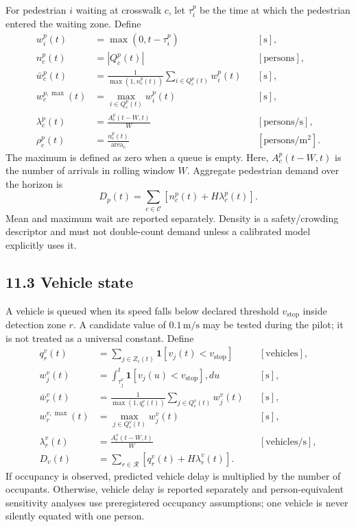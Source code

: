 \documentclass[
  english,
  11pt,
  a4paper,
]{article}
\begin{document}
For pedestrian \(i\) waiting at crosswalk \(c\), let \(\tau_i^p\) be
the time at which the pedestrian entered the waiting zone. Define
\begin{align}
  w_i^p(t) &= \max\!\left(0,t-\tau_i^p\right) &&[\mathrm{s}],\\
  n_c^p(t) &= \left|Q_c^p(t)\right| &&[\mathrm{persons}],\\
  \bar w_c^p(t) &= \frac{1}{\max(1,n_c^p(t))}
    \sum_{i\in Q_c^p(t)} w_i^p(t) &&[\mathrm{s}],\\
  w_c^{p,\max}(t) &= \max_{i\in Q_c^p(t)} w_i^p(t) &&[\mathrm{s}],\\
  \lambda_c^p(t) &= \frac{A_c^p(t-W,t)}{W} &&[\mathrm{persons/s}],\\
  \rho_c^p(t) &= \frac{n_c^p(t)}{\operatorname{area}_c}
    &&[\mathrm{persons/m^2}].
\end{align}
The maximum is defined as zero when a queue is empty. Here,
\(A_c^p(t-W,t)\) is the number of arrivals in rolling window \(W\).
Aggregate pedestrian demand over the horizon is
\[
  D_p(t)=\sum_{c\in\mathcal{C}}
  \left[n_c^p(t)+H\lambda_c^p(t)\right].
\]
Mean and maximum wait are reported separately. Density is a
safety/crowding descriptor and must not double-count demand unless a
calibrated model explicitly uses it.

\subsection{11.3 Vehicle state}\label{vehicle-state}

A vehicle is queued when its speed falls below declared threshold
\(v_{\mathrm{stop}}\) inside detection zone \(r\). A candidate value of
\(0.1\,\mathrm{m/s}\) may be tested during the pilot; it is not treated
as a universal constant. Define
\begin{align}
  q_r^v(t) &= \sum_{j\in Z_r(t)}
    \mathbf{1}\!\left[v_j(t)<v_{\mathrm{stop}}\right]
    &&[\mathrm{vehicles}],\\
  w_j^v(t) &= \int_{\tau_j^v}^{t}
    \mathbf{1}\!\left[v_j(u)<v_{\mathrm{stop}}\right],du
    &&[\mathrm{s}],\\
  \bar w_r^v(t) &= \frac{1}{\max(1,q_r^v(t))}
    \sum_{j\in Q_r^v(t)} w_j^v(t) &&[\mathrm{s}],\\
  w_r^{v,\max}(t) &= \max_{j\in Q_r^v(t)}w_j^v(t)
    &&[\mathrm{s}],\\
  \lambda_r^v(t) &= \frac{A_r^v(t-W,t)}{W}
    &&[\mathrm{vehicles/s}],\\
  D_v(t) &= \sum_{r\in\mathcal{R}}
    \left[q_r^v(t)+H\lambda_r^v(t)\right].
\end{align}
If occupancy is observed, predicted vehicle delay is multiplied by the
number of occupants. Otherwise, vehicle delay is reported separately
and person-equivalent sensitivity analyses use preregistered occupancy
assumptions; one vehicle is never silently equated with one person.
\end{document}
